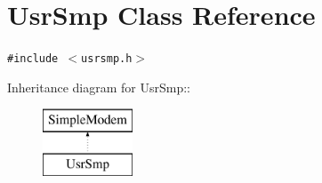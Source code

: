 \section{Usr\-Smp Class Reference}
\label{classUsrSmp}
{\tt \#include $<$usrsmp.h$>$}

Inheritance diagram for Usr\-Smp::\begin{figure}[H]
\begin{center}
\leavevmode
\includegraphics[height=2cm]{classUsrSmp}
\end{center}
\end{figure}
